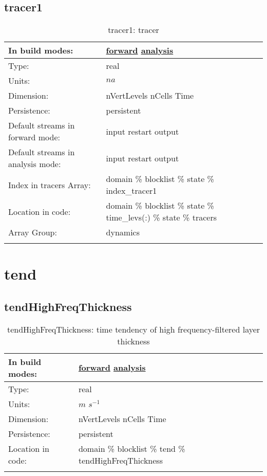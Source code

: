 \subsection[tracer1]{tracer1}
\label{subsec:var_sec_state_tracer1}
\begin{center}
\begin{longtable}{| p{2.0in} | p{4.0in} |}
        \hline 
        In build modes: & \hyperref[subsec:forward_var_tab_state]{forward} \hyperref[subsec:analysis_var_tab_state]{analysis} \\
        \hline 
        Type: & real \\
        \hline 
        Units: & $na$ \\
        \hline 
        Dimension: & nVertLevels nCells Time \\
        \hline 
        Persistence: & persistent \\
        \hline 
		 Default streams in forward mode: &  input restart output \\
        \hline 
		 Default streams in analysis mode: &  input restart output \\
        \hline 
		 Index in tracers Array: & domain \% blocklist \% state \% index\_tracer1 \\
		 \hline 
		 Location in code: & domain \% blocklist \% state \% time\_levs(:) \% state \% tracers \\
		 \hline 
		 Array Group: & dynamics \\
		 \hline 
    \caption{tracer1: tracer}
\end{longtable}
\end{center}
\section[tend]{tend}
\label{sec:var_sec_tend}
\subsection[tendHighFreqThickness]{tendHighFreqThickness}
\label{subsec:var_sec_tend_tendHighFreqThickness}
\begin{center}
\begin{longtable}{| p{2.0in} | p{4.0in} |}
        \hline 
        In build modes: & \hyperref[subsec:forward_var_tab_tend]{forward} \hyperref[subsec:analysis_var_tab_tend]{analysis} \\
        \hline 
        Type: & real \\
        \hline 
        Units: & $m$ $s^{-1}$ \\
        \hline 
        Dimension: & nVertLevels nCells Time \\
        \hline 
        Persistence: & persistent \\
        \hline 
		 Location in code: & domain \% blocklist \% tend \% tendHighFreqThickness \\
		 \hline 
    \caption{tendHighFreqThickness: time tendency of high frequency-filtered layer thickness}
\end{longtable}
\end{center}

